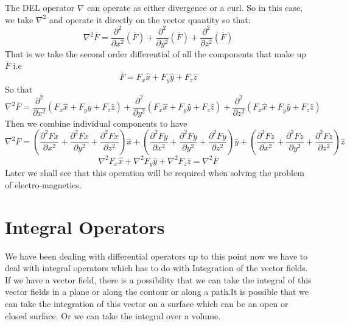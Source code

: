 The DEL operator $\nabla$ can operate as either divergence or a curl. So in this case, we take $\nabla^2$ and operate it directly on the vector quantity so that:
\begin{dmath}
\nabla^{2} \overline{F} = \frac{\partial ^ {2}}{\partial x^{2}}(\overline{F}) + \frac{\partial ^ {2}}{\partial y^{2}}(\overline{F}) + \frac{\partial ^ {2}}{\partial z^{2}}(\overline{F})
\end{dmath}
That is we take the second order differential of all the components that make up $\overline{F}$ i.e
\begin{equation*}
\overline{F} = F_{x}\hat x + F_{y}\hat y + F_{z}\hat z
\end{equation*}
So that
\begin{dmath}
\nabla^{2} \overline{F} = \frac{\partial ^ {2}}{\partial x^{2}}(F_{x}\hat x + F_{y}\hat y + F_{z}\hat z) + \frac{\partial ^ {2}}{\partial y^{2}}(F_{x}\hat x + F_{y}\hat y + F_{z}\hat z) + 
\frac{\partial ^ {2}}{\partial z^{2}}(F_{x}\hat x + F_{y}\hat y + F_{z}\hat z)
\end{dmath}
Then we combine individual components to have
\begin{dmath*}
\nabla^{2}F = (\frac{\partial ^{2} Fx}{\partial x^2} + \frac{\partial ^{2} Fx}{\partial y^2} + \frac{\partial ^{2} Fx}{\partial z^2})\hat{x} + (\frac{\partial ^{2} Fy}{\partial x^2} + \frac{\partial ^{2} Fy}{\partial y^2} + \frac{\partial ^{2} Fy}{\partial z^2})\hat{y} + (\frac{\partial ^{2} Fz}{\partial x^2} + \frac{\partial ^{2} Fz}{\partial y^2} + \frac{\partial ^{2} Fz}{\partial z^2})\hat{z}
\end{dmath*}
\begin{dmath}
\nabla^{2}F_x \hat x + \nabla^{2}F_y \hat y + \nabla^{2}F_z \hat z = \nabla^{2}\overline{F}
\end{dmath}
Later we shall see that this operation will be required when solving the problem of electro-magnetics.

\section{Integral Operators}

We have been dealing with differential operators up to this point now we have to deal with integral operators which has to do with Integration of the vector fields. If we have a vector field, there is a possibility that we can take the integral of this vector fields in a plane or along the contour or along a path.It is possible that we can take the integration of this vector on a surface which can be an open or closed surface. Or we can take the integral over a volume. 

